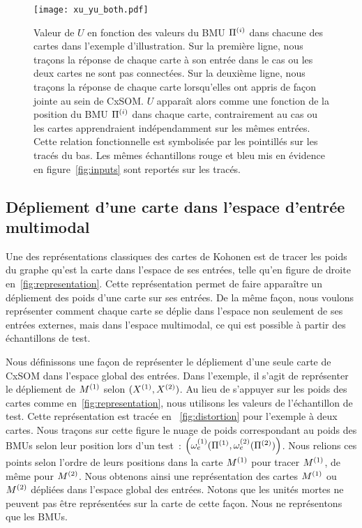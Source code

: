 \documentclass[../main]{subfiles}
\begin{document}
\begin{figure}
\centering
\texttt{[image: xu\_yu\_both.pdf]}
\caption{Valeur de $U$ en fonction des valeurs du BMU $\Pi^{({i})}$ dans chacune des cartes dans l'exemple d'illustration. Sur la première ligne, nous traçons la réponse de chaque carte à son entrée dans le cas ou les deux cartes ne sont pas connectées. Sur la deuxième ligne, nous traçons la réponse de chaque carte lorsqu'elles ont appris de façon jointe au sein de CxSOM.
$U$ apparaît alors comme une fonction de la position du BMU $\Pi^{({i})}$ dans chaque carte, contrairement au cas ou les cartes apprendraient indépendamment sur les mêmes entrées. Cette relation fonctionnelle est symbolisée par les pointillés sur les tracés du bas. Les mêmes échantillons rouge et bleu mis en évidence en figure~\ref{fig:inputs} sont reportés sur les tracés.}
\label{fig:piu}
\end{figure}

\subsection{Dépliement d'une carte dans l'espace d'entrée multimodal}

Une des représentations classiques des cartes de Kohonen est de tracer les poids du graphe qu'est la carte dans l'espace de ses entrées, telle qu'en figure de droite en~\ref{fig:representation}. Cette représentation permet de faire apparaître un dépliement des poids d'une carte sur ses entrées.
De la même façon, nous voulons représenter comment chaque carte se déplie dans l'espace non seulement de ses entrées externes, mais dans l'espace multimodal, ce qui est possible à partir des échantillons de test.

Nous définissons une façon de représenter le dépliement d'une seule carte de CxSOM dans l'espace global des entrées. Dans l'exemple, il s'agit de représenter le dépliement de $M^{({1})}$ selon $(X^{({1})},X^{({2})})$.
Au lieu de s'appuyer sur les poids des cartes comme en~\ref{fig:representation}, nous utilisons les valeurs de l'échantillon de test. Cette représentation est tracée en ~\ref{fig:distortion} pour l'exemple à deux cartes.
Nous traçons sur cette figure le nuage de poids correspondant au poids des BMUs selon leur position lors d'un test~: $\left( \omega_e^{({1})}(\Pi^{({1})},\omega_e^{({2})}(\Pi^{({2})}) \right)$. Nous relions ces points selon l'ordre de leurs positions dans la carte $M^{({1})}$ pour tracer $M^{({1})}$, de même pour $M^{({2})}$. Nous obtenons ainsi une représentation des cartes $M^{({1})}$ ou $M^{({2})}$ dépliées dans l'espace global des entrées. 
Notons que les unités mortes ne peuvent pas être représentées sur la carte de cette façon. Nous ne représentons que les BMUs. 
\end{document}
